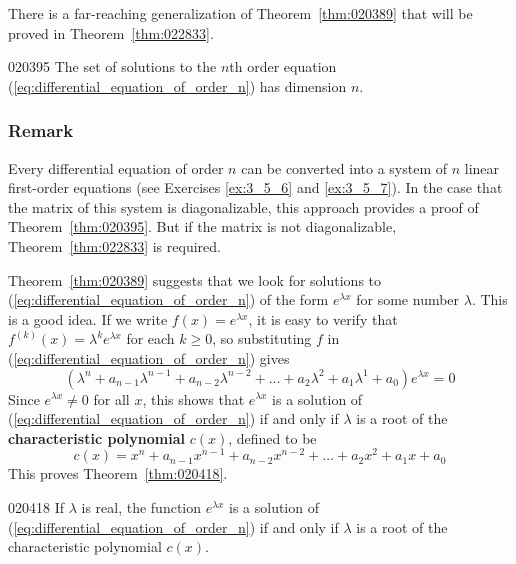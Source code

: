 There is a far-reaching generalization of Theorem~\ref{thm:020389} that will be proved in Theorem~\ref{thm:022833}.

\begin{theorem}{}{020395}
The set of solutions to the $n$th order equation (\ref{eq:differential_equation_of_order_n}) has dimension $n$.
\end{theorem}

\subsubsection*{Remark}
\vspace{-1em}
Every differential equation of order $n$ can be converted into a system of $n$ linear first-order equations (see Exercises \ref{ex:3_5_6} and \ref{ex:3_5_7}). In the case that the matrix of this system is diagonalizable, this approach provides a proof of Theorem~\ref{thm:020395}. But if the matrix is not diagonalizable, Theorem~\ref{thm:022833} is required.

\bigskip

Theorem~\ref{thm:020389} suggests that we look for solutions to (\ref{eq:differential_equation_of_order_n}) of the form $e^{\lambda x}$ for some number $\lambda$. This is a good idea. If we write $f(x) = e^{\lambda x}$, it is easy to verify that $f^{(k)}(x) = \lambda^{k}e^{\lambda x}$ for each $k \geq 0$, so substituting $f$ in (\ref{eq:differential_equation_of_order_n}) gives
\begin{equation*}
(\lambda^n + a_{n - 1}\lambda^{n - 1} + a_{n - 2}\lambda^{n - 2} + \dots + a_2\lambda^2 + a_1\lambda^1 + a_0)e^{\lambda x} = 0
\end{equation*}
Since $e^{\lambda x} \neq 0$ for all $x$, this shows that $e^{\lambda x}$ is a solution of (\ref{eq:differential_equation_of_order_n}) if and only if $\lambda$ is a root of the \textbf{characteristic polynomial} $c(x)$, defined to be
\begin{equation*}
c(x) = x^n + a_{n - 1}x^{n - 1} + a_{n - 2}x^{n - 2} + \dots + a_2x^2 + a_1x + a_0
\end{equation*}
This proves Theorem~\ref{thm:020418}.

\begin{theorem}{}{020418}
If $\lambda$ is real, the function $e^{\lambda x}$ is a solution of (\ref{eq:differential_equation_of_order_n}) if and only if $\lambda$ is a root of the characteristic polynomial $c(x)$.
\end{theorem}

